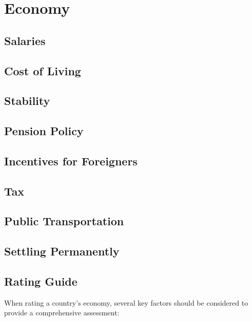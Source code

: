 \section{Economy}

\subsection{Salaries}

\subsection{Cost of Living}

\subsection{Stability}

\subsection{Pension Policy}

\subsection{Incentives for Foreigners}

\subsection{Tax}

\subsection{Public Transportation}

\subsection{Settling Permanently}

\subsection{Rating Guide}
When rating a country's economy, several key factors should be
considered to provide a comprehensive assessment:

